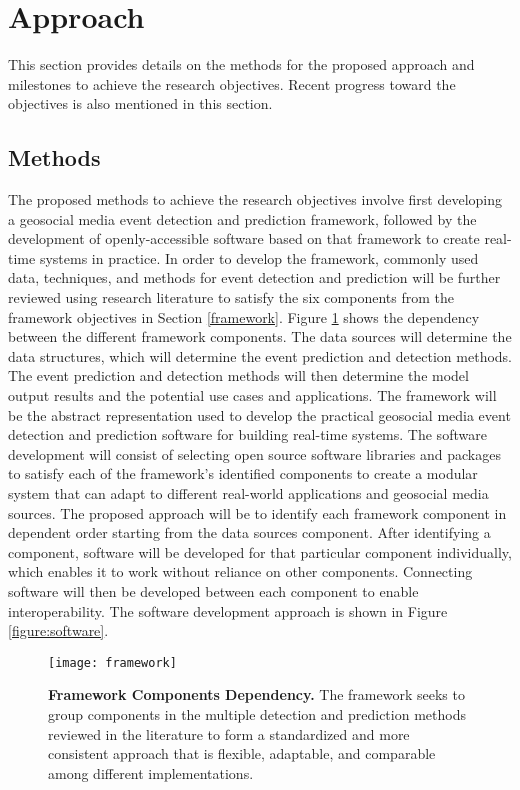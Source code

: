 

\section{Approach} \label{approach}

This section provides details on the methods for  the proposed approach and milestones to achieve the research objectives. Recent progress toward the objectives is also mentioned in this section.

\subsection{Methods} \label{methods}

The proposed methods to achieve the research objectives involve first developing a geosocial media event detection and prediction framework, followed by the development of openly-accessible software based on that framework to create real-time systems in practice. In order to develop the framework, commonly used data, techniques, and methods for event detection and prediction will be further reviewed using research literature to satisfy the six components from the framework objectives in Section \ref{framework}. Figure \ref{figure:framework} shows the dependency between the different framework components. The data sources will determine the data structures, which will determine the event prediction and detection methods. The event prediction and detection methods will then determine the model output results and the potential use cases and applications. The framework will be the abstract representation used to develop the practical geosocial media event detection and prediction software for building real-time systems. The software development will consist of selecting open source software libraries and packages to satisfy each of the framework's identified components to create a modular system that can adapt to different real-world applications and geosocial media sources. The proposed approach will be to identify each framework component in dependent order starting from the data sources component. After identifying a component, software will be developed for that particular component individually, which enables it to work without reliance on other components. Connecting software will then be developed between each component to enable interoperability. The software development approach is shown in Figure \ref{figure:software}.

\begin{figure}[!htb]
	\centering
	\texttt{[image: framework]}
	\caption{\textbf{Framework Components Dependency.} The framework seeks to group components in the multiple detection and prediction methods reviewed in the literature to form a standardized and more consistent approach that is flexible, adaptable, and comparable among different implementations.}
	\label{figure:framework}
\end{figure}

